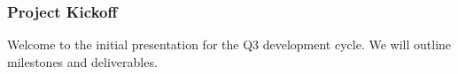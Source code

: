 \documentclass{beamer}
\begin{document}
\begin{frame}
\frametitle{Project Kickoff}
Welcome to the initial presentation for the Q3 development cycle. We will outline milestones and deliverables.
\end{frame}
\end{document}
